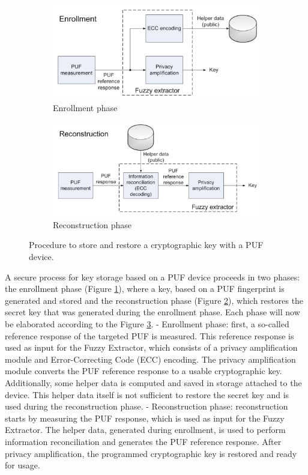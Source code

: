 \documentclass[USenglish]{article}
\begin{document}
\begin{figure}
	\centering
	\begin{subfigure}{.5\textwidth}
		\centering
		\includegraphics[width=.9\linewidth]{assets/puf_enrollment}
		\caption{Enrollment phase}
		\label{fig:puf_enrollment}
	\end{subfigure}%
	\begin{subfigure}{.5\textwidth}
		\centering
		\includegraphics[width=.9\linewidth]{assets/puf_reconstruction}
		\caption{Reconstruction phase}
		\label{fig:puf_reconstruction}
	\end{subfigure}
	\caption{Procedure to store and restore a cryptographic key with a PUF device.}
	\label{fig:puf_key_storage}
\end{figure}

A secure process for key storage based on a PUF device proceeds in two phases: the enrollment phase (Figure \ref{fig:puf_enrollment}), where a key, based on a PUF fingerprint is generated and stored and the reconstruction phase (Figure \ref{fig:puf_reconstruction}), which restores the secret key that was generated during the enrollment phase.
Each phase will now be elaborated according to the Figure \ref{fig:puf_key_storage}.
- Enrollment phase: first, a so-called reference response of the targeted PUF is measured. This reference response is used as input for the Fuzzy Extractor, which consists of a privacy amplification module and Error-Correcting Code (ECC) encoding. The privacy amplification module converts the PUF reference response to a usable cryptographic key. Additionally, some helper data is computed and saved in storage attached to the device. This helper data itself is not sufficient to restore the secret key and is used during the reconstruction phase.
- Reconstruction phase: reconstruction starts by measuring the PUF response, which is used as input for the Fuzzy Extractor. The helper data, generated during enrollment, is used to perform information reconciliation and generates the PUF reference response. After privacy amplification, the programmed cryptographic key is restored and ready for usage.
\end{document}
